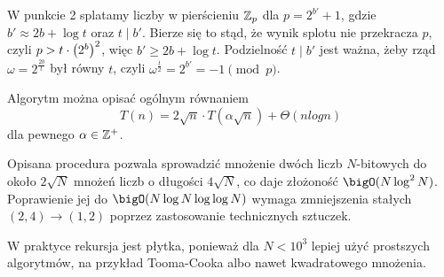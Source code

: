 W punkcie 2 splatamy liczby w pierścieniu \( \mathbb{Z}_p \) dla \( p = 2^{b'} + 1 \), gdzie \( b' \approx 2b + \log t \) oraz \( t \mid b' \). Bierze się to stąd, że wynik splotu nie przekracza \( p \), czyli \( p > t \cdot \left(2^b\right)^2 \), więc \( b' \geq 2b + \log t \).
Podzielność \( t \mid b' \) jest ważna, żeby rząd \( \omega = 2^{\frac{2b}{t}} \) był równy \( t \), czyli \( \omega^{\frac{t}{2}} = 2^{b'} = -1 \pmod{p} \).

Algorytm można opisać ogólnym równaniem
\[
    T(n) = 2 \sqrt{n} \cdot T(\alpha \sqrt{n}) + \Theta(n log n)
\]
dla pewnego \( \alpha \in \mathbb{Z}^{+} \).

Opisana procedura pozwala sprowadzić mnożenie dwóch liczb \( N \)-bitowych do około \( 2\sqrt{N} \) mnożeń liczb o długości \( 4\sqrt{N} \), co daje złożoność \( \bigO(N \log^2 N) \).
Poprawienie jej do \( \bigO(N \log N \log \log N) \) wymaga zmniejszenia stałych \( (2, 4) \rightarrow (1, 2) \) poprzez zastosowanie technicznych sztuczek.
        
W praktyce rekursja jest płytka, ponieważ dla \( N < 10^3 \) lepiej użyć prostszych algorytmów, na przykład Tooma-Cooka albo nawet kwadratowego mnożenia.
